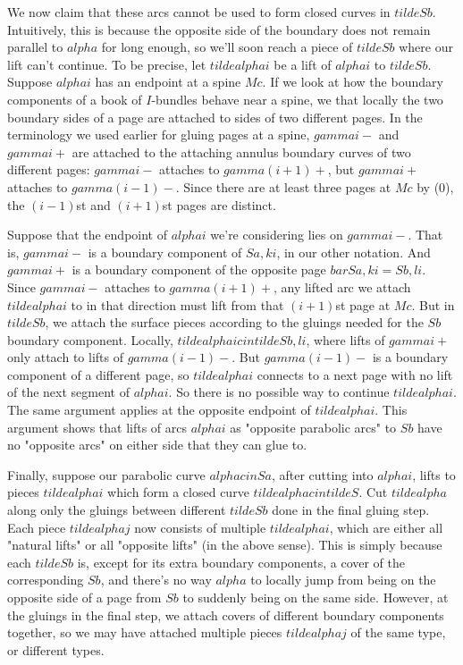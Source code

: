 \documentclass[12pt]{amsart}
\theoremstyle{definition}
\theoremstyle{remark}
\begin{document}
We now claim that these arcs cannot be used to form closed curves in $tildeSb$.
Intuitively, this is because the opposite side of the boundary does not remain
parallel to $alpha$ for long enough, so we'll soon reach a piece of $tildeSb$
where our lift can't continue.  To be precise, let $tildealphai$ be a lift of
$alphai$ to $tildeSb$.  Suppose $alphai$ has an endpoint at a spine $Mc$. If we
look at how the boundary components of a book of $I$-bundles behave near
a spine, we that locally the two boundary sides of a page are attached to sides
of two different pages.  In the terminology we used earlier for gluing pages at
a spine, $gammai-$ and $gammai+$ are attached to the attaching annulus boundary
curves of two different pages: $gammai-$ attaches to $gamma(i+1)+$, but
$gammai+$ attaches to $gamma(i-1)-$.  Since there are at least three pages at
$Mc$ by (0), the $(i-1)$st and $(i+1)$st pages are distinct.

Suppose that the endpoint of $alphai$ we're considering lies on $gammai-$. That
is, $gammai-$ is a boundary component of $Sa,ki$, in our other notation. And
$gammai+$ is a boundary component of the opposite page $barSa,ki = Sb,li$.
Since $gammai-$ attaches to $gamma(i+1)+$, any lifted arc we attach
$tildealphai$ to in that direction must lift from that $(i+1)$st page at $Mc$.
But in $tildeSb$, we attach the surface pieces according to the gluings needed
for the $Sb$ boundary component.  Locally, $tildealphai cin tildeSb,li$, where
lifts of $gammai+$ only attach to lifts of $gamma(i-1)-$. But $gamma(i-1)-$ is
a boundary component of a different page, so $tildealphai$ connects to a next
page with no lift of the next segment of $alphai$. So there is no possible way
to continue $tildealphai$.  The same argument applies at the opposite endpoint
of $tildealphai$. This argument shows that lifts of arcs $alphai$ as "opposite
parabolic arcs" to $Sb$ have no "opposite arcs" on either side that they can
glue to.

Finally, suppose our parabolic curve $alpha cin Sa$, after cutting into
$alphai$, lifts to pieces $tildealphai$ which form a closed curve $tildealpha
cin tildeS$.  Cut $tildealpha$ along only the gluings between different
$tildeSb$ done in the final gluing step. Each piece $tildealphaj$ now consists
of multiple $tildealphai$, which are either all "natural lifts" or all
"opposite lifts" (in the above sense). This is simply because each $tildeSb$
is, except for its extra boundary components, a cover of the corresponding
$Sb$, and there's no way $alpha$ to locally jump from being on the opposite
side of a page from $Sb$ to suddenly being on the same side. However, at the
gluings in the final step, we attach covers of different boundary components
together, so we may have attached multiple pieces $tildealphaj$ of the same
type, or different types.
\end{document}
